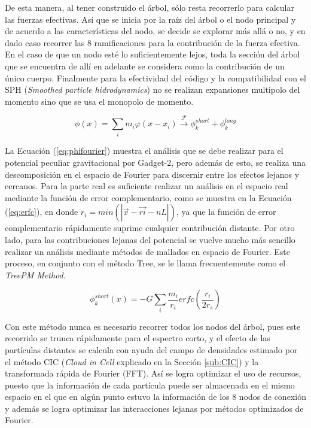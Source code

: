 De esta manera, al tener construido el árbol, sólo resta recorrerlo para calcular las fuerzas efectivas. Así que se inicia por la raíz del árbol o el nodo principal y de acuerdo a las características del nodo, se decide se explorar más allá o no, y en dado caso recorrer las 8 ramificaciones para la contribución de la fuerza efectiva. En el caso de que un nodo esté lo suficientemente lejos, toda la sección del árbol que se encuentra de allí en adelante se considera como la contribución de un único cuerpo. Finalmente para la efectividad del código y la compatibilidad con el SPH (\textit{Smoothed particle hidrodynamics}) no se realizan expansiones multipolo del momento sino que se usa el monopolo de momento. 

\begin{equation}
\phi(x)=\sum\limits_i m_i\varphi(x-x_i)\xrightarrow{\mathscr{F}}\phi^{short}_{k}+\phi^{long}_{k}
\label{eq:phifourier}
\end{equation}

La Ecuación (\ref{eq:phifourier}) muestra el análisis que se debe realizar para el potencial peculiar gravitacional por Gadget-2, pero además de esto, se realiza una descomposición en el espacio de Fourier para discernir entre los efectos lejanos y cercanos. Para la parte real es suficiente realizar un análisis en el espacio real mediante la función de error complementario, como se muestra en la Ecuación (\ref{eq:erfc}), en donde $r_i=min(|\vec{x}-\vec{ri}-nL|)$, ya que la función de error complementario rápidamente suprime cualquier contribución distante. Por otro lado, para las contribuciones lejanas del potencial se vuelve mucho más sencillo realizar un análisis mediante métodos de mallados en espacio de Fourier. Este proceso, en conjunto con el método Tree, se le llama frecuentemente como el \textit{TreePM Method}.

\begin{equation}
\phi^{short}_k(x)=-G\sum\limits_i\frac{m_i}{r_i}erfc\left(\frac{r_i}{2r_s}\right)
\label{eq:erfc}
\end{equation}

Con este método nunca es necesario recorrer todos los nodos del árbol, pues este recorrido se trunca rápidamente para el espectro corto, y el efecto de las partículas distantes se calcula con ayuda del campo de densidades estimado por el método CIC (\textit{Cloud in Cell} explicado en la Sección \ref{sub:CIC}) y la transformada rápida de Fourier (FFT). Así se logra optimizar el uso de recursos, puesto que la información de cada partícula puede ser almacenada en el mismo espacio en el que en algún punto estuvo la información de los 8 nodos de conexión y además se logra optimizar las interacciones lejanas por métodos optimizados de Fourier.